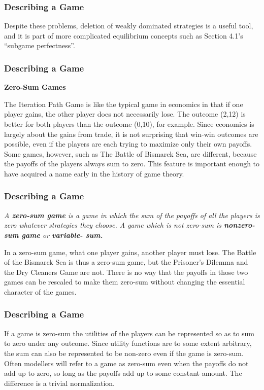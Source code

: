 \begin{frame}[fragile]\frametitle{Describing a Game}
Despite these problems, deletion of weakly dominated strategies is a useful
tool, and it is part of more complicated equilibrium concepts  such as  Section
4.1's ``subgame perfectness''.

\end{frame}
 \begin{frame}[fragile]\frametitle{Describing a Game}

 
  {\bf Zero-Sum Games}

  The Iteration Path Game is  like the typical game in economics in that  if one
player gains, the other player does not necessarily lose. The outcome (2,12) is
better for both players than the outcome (0,10), for example.  Since economics
is largely about the gains from trade, it is not surprising that win-win
outcomes are possible, even if the players are each trying to maximize only
their own payoffs. Some games, however, such as The Battle of Bismarck Sea, are
different, because  the  payoffs of the players always sum to zero.  This
feature is important enough to  have acquired a name early in the history of
game theory.

\end{frame}
 \begin{frame}[fragile]\frametitle{Describing a Game}
 {\it A {\bf zero-sum game} is a game in which the sum of the payoffs of all the
players is zero whatever strategies they choose. A game which is not zero-sum is
{\bf nonzero-sum game} or {\bf variable- sum. }}

    In a zero-sum game, what one player gains, another player must lose.  { The
Battle of the Bismarck Sea}   is thus  a zero-sum game, but the  Prisoner's
Dilemma and  the Dry Cleaners Game are not. There is no way  that the payoffs in
those two  games can be rescaled to make them zero-sum without changing the
essential character of the games.

\end{frame}
 \begin{frame}[fragile]\frametitle{Describing a Game}
  If a game is zero-sum the utilities of the players can be represented so as to
sum to zero under any outcome. Since utility functions are to some extent
arbitrary, the sum can also be represented to be non-zero even if the game is
zero-sum. Often modellers will refer to a game as zero-sum even when the payoffs
do not add up to zero, so long as the payoffs add up to some constant amount.
The difference is a trivial normalization.

\end{frame}
